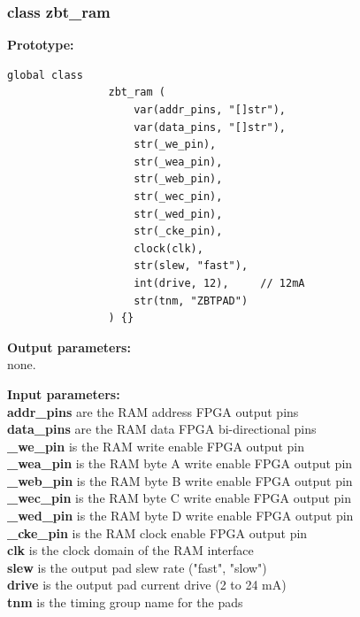         \subsubsection{class zbt\_ram\label{sec:lczbtram}}
        
            {\bf Prototype:} \\
            \vsp
            \begin{lstlisting}[gobble=12, language=threepl]
                global class
                zbt_ram (
                    var(addr_pins, "[]str"),
                    var(data_pins, "[]str"),
                    str(_we_pin),
                    str(_wea_pin),
                    str(_web_pin),
                    str(_wec_pin),
                    str(_wed_pin),
                    str(_cke_pin),
                    clock(clk),
                    str(slew, "fast"),
                    int(drive, 12),     // 12mA
                    str(tnm, "ZBTPAD")
                ) {}
            \end{lstlisting}

            {\bf Output parameters:} \\
            
            none.

            {\bf Input parameters:} \\
            {\bf addr\_pins} are the RAM address FPGA output pins \\
            {\bf data\_pins} are the RAM data FPGA bi-directional pins \\
            {\bf \_we\_pin} is the RAM write enable FPGA output pin \\
            {\bf \_wea\_pin} is the RAM byte A write enable FPGA output pin \\
            {\bf \_web\_pin} is the RAM byte B write enable FPGA output pin \\
            {\bf \_wec\_pin} is the RAM byte C write enable FPGA output pin \\
            {\bf \_wed\_pin} is the RAM byte D write enable FPGA output pin \\
            {\bf \_cke\_pin} is the RAM clock enable FPGA output pin \\
            {\bf clk} is the clock domain of the RAM interface \\
            {\bf slew} is the output pad slew rate ("fast", "slow") \\
            {\bf drive} is the output pad current drive (2 to 24 mA)\\
            {\bf tnm} is the timing group name for the pads \\
            

